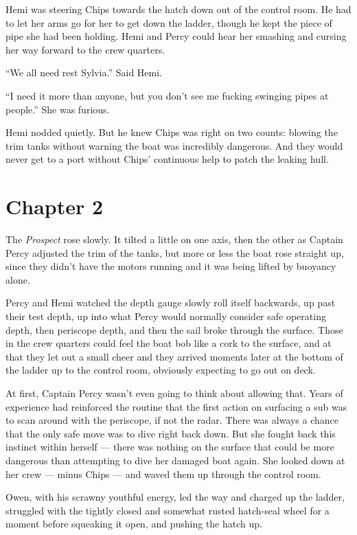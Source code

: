 \documentclass[]{scrbook}
\begin{document}
Hemi was steering Chips towards the hatch down out of the control room.
He had to let her arms go for her to get down the ladder, though he kept
the piece of pipe she had been holding. Hemi and Percy could hear her
smashing and cursing her way forward to the crew quarters.

``We all need rest Sylvia.'' Said Hemi.

``I need it more than anyone, but you don't see me fucking swinging
pipes at people.'' She was furious.

Hemi nodded quietly. But he knew Chips was right on two counts: blowing
the trim tanks without warning the boat was incredibly dangerous. And
they would never get to a port without Chips' continuous help to patch
the leaking hull.

\hypertarget{chapter-2}{%
\chapter*{Chapter 2}\label{chapter-2}}

The \emph{Prospect} rose slowly. It tilted a little on one axis, then
the other as Captain Percy adjusted the trim of the tanks, but more or
less the boat rose straight up, since they didn't have the motors
running and it was being lifted by buoyancy alone.

Percy and Hemi watched the depth gauge slowly roll itself backwards, up
past their test depth, up into what Percy would normally consider safe
operating depth, then periscope depth, and then the sail broke through
the surface. Those in the crew quarters could feel the boat bob like a
cork to the surface, and at that they let out a small cheer and they
arrived moments later at the bottom of the ladder up to the control
room, obviously expecting to go out on deck.

At first, Captain Percy wasn't even going to think about allowing that.
Years of experience had reinforced the routine that the first action on
surfacing a sub was to scan around with the periscope, if not the radar.
There was always a chance that the only safe move was to dive right back
down. But she fought back this instinct within herself --- there was
nothing on the surface that could be more dangerous than attempting to
dive her damaged boat again. She looked down at her crew --- minus Chips
--- and waved them up through the control room.

Owen, with his scrawny youthful energy, led the way and charged up the
ladder, struggled with the tightly closed and somewhat rusted hatch-seal
wheel for a moment before squeaking it open, and pushing the hatch up.
\end{document}
